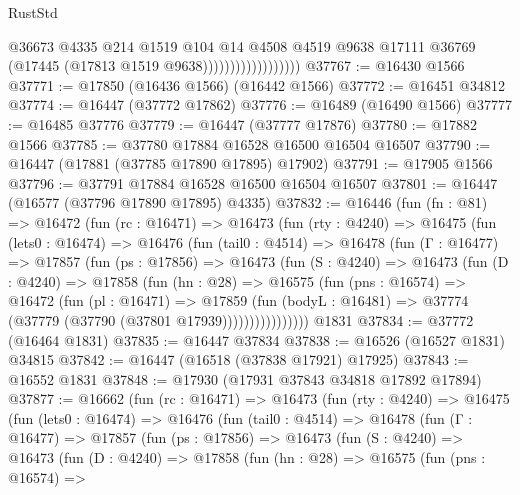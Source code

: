 \begin{lexlean}{RustStd}
\begin{coremodule}
                                    @36673
                                    @4335
                                    @214
                                    @1519
                                    @104
                                    @14
                                    @4508
                                    @4519
                                    @9638
                                    @17111
                                    @36769
                                    (@17445 (@17813 @1519 @9638))))))))))))))))))
@37767 := @16430 @1566
@37771 := @17850 (@16436 @1566) (@16442 @1566)
@37772 := @16451 @34812
@37774 := @16447 (@37772 @17862)
@37776 := @16489 (@16490 @1566)
@37777 := @16485 @37776
@37779 := @16447 (@37777 @17876)
@37780 := @17882 @1566
@37785 := @37780 @17884 @16528 @16500 @16504 @16507
@37790 := @16447 (@17881 (@37785 @17890 @17895) @17902)
@37791 := @17905 @1566
@37796 := @37791 @17884 @16528 @16500 @16504 @16507
@37801 := @16447 (@16577 (@37796 @17890 @17895) @4335)
@37832 := @16446
    (fun (fn : @81) =>
    @16472
      (fun (rc : @16471) =>
      @16473
        (fun (rty : @4240) =>
        @16475
          (fun (lets0 : @16474) =>
          @16476
            (fun (tail0 : @4514) =>
            @16478
              (fun (Γ : @16477) =>
              @17857
                (fun (ps : @17856) =>
                @16473
                  (fun (S : @4240) =>
                  @16473
                    (fun (D : @4240) =>
                    @17858
                      (fun (hn : @28) =>
                      @16575
                        (fun (pns : @16574) =>
                        @16472
                          (fun (pl : @16471) =>
                          @17859
                            (fun (bodyL : @16481) =>
                            @37774 (@37779 (@37790 (@37801 @17939))))))))))))))))
    @1831
@37834 := @37772 (@16464 @1831)
@37835 := @16447 @37834
@37838 := @16526 (@16527 @1831) @34815
@37842 := @16447 (@16518 (@37838 @17921) @17925)
@37843 := @16552 @1831
@37848 := @17930 (@17931 @37843 @34818 @17892 @17894)
@37877 := @16662
    (fun (rc : @16471) =>
    @16473
      (fun (rty : @4240) =>
      @16475
        (fun (lets0 : @16474) =>
        @16476
          (fun (tail0 : @4514) =>
          @16478
            (fun (Γ : @16477) =>
            @17857
              (fun (ps : @17856) =>
              @16473
                (fun (S : @4240) =>
                @16473
                  (fun (D : @4240) =>
                  @17858
                    (fun (hn : @28) =>
                    @16575
                      (fun (pns : @16574) =>

\end{coremodule}
\end{lexlean}
